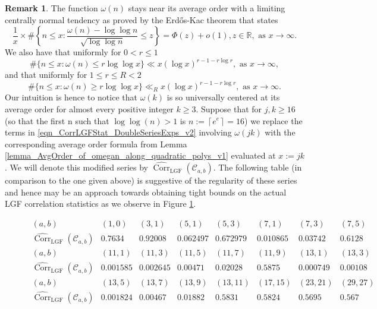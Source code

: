 \documentclass[12pt,reqno,a4letter]{article}
\numberwithin{figure}{section}
\numberwithin{table}{section}
\numberwithin{equation}{section}
\newcommand{\cf}{\textit{cf.~}}
\theoremstyle{plain}
\numberwithin{theorem}{section}
\theoremstyle{definition}
\newtheorem{remark}[theorem]{Remark}
\begin{document}
\begin{remark}
The function $\omega(n)$ stays near its 
average order with a limiting centrally normal tendency as 
proved by the Erd\H{o}s-Kac theorem that states 
\cite[\S 1.7]{IWANIEC-KOWALSKI} \cite[\cf \S 7.4]{MV}
\[
\frac{1}{x} \times \#\left\{n \leq x: \frac{\omega(n) - \log\log n}{\sqrt{\log\log n}} \leq z\right\} = 
     \Phi(z) + o(1), z \in \mathbb{R}, \text{ as } x \rightarrow \infty. 
\]
We also have that uniformly for $0 < r \leq 1$ 
\[
\#\{n \leq x: \omega(n) \leq r \log\log x\} \ll x (\log x)^{r-1-r\log r}, 
     \text{ as } x \rightarrow \infty, 
\]
and that uniformly for $1 \leq r \leq R < 2$ 
\[
\#\{n \leq x: \omega(n) \geq r \log\log x\} \ll_R x (\log x)^{r-1-r\log r}, 
     \text{ as } x \rightarrow \infty. 
\]
Our intuition is hence to notice that $\omega(k)$ is so universally centered at its average order 
for almost every positive integer $k \geq 3$. 
Suppose that for $j, k \geq 16$ 
(so that the first n such that $\log\log(n) > 1$ is $n := \left\lceil e^e \right\rceil = 16$) 
we replace the terms in 
\eqref{eqn_CorrLGFStat_DoubleSeriesExps_v2} 
involving $\omega(jk)$ with the corresponding average order formula from 
Lemma \ref{lemma_AvgOrder_of_omegan_along_quadratic_polys_v1} evaluated at $x := jk$. 
We will denote this modified series by 
$\widehat{\operatorname{Corr}}_{\operatorname{LGF}}(\mathcal{C}_{a,b})$. 
The following table (in comparison to the one given above) is suggestive of the regularity 
of these series and hence may be an approach towards obtaining tight bounds on the 
actual LGF correlation statistics as we observe in 
Figure \ref{figure_CorrLGFHatCab_v2}. 
\end{remark}

\begin{figure}[h!]
\small
\begin{equation*}
\boxed{
\begin{array}{l|l|l|l|l|l|l|l}
(a, b) & (1, 0) & (3, 1) & (5, 1) & (5, 3) & (7, 1) & (7, 3) & (7, 5) \\ \hline
\widehat{\operatorname{Corr}}_{\operatorname{LGF}}(\mathcal{C}_{a,b}) & 
     0.7634 & 0.92008 & 0.062497 & 0.672979 & 0.010865 & 0.03742 & 0.6128 \\ \hline\hline
(a, b) & (11, 1) & (11, 3) & (11, 5) & (11, 7) & (11, 9) & (13, 1) & (13, 3) \\ \hline
\widehat{\operatorname{Corr}}_{\operatorname{LGF}}(\mathcal{C}_{a,b}) & 
     0.001585 & 0.002645 & 0.00471 & 0.02028 & 0.5875 & 0.000749 & 0.00108 \\ \hline\hline 
(a, b) & (13, 5) & (13, 7) & (13, 9) & (13, 11) & (17, 15) & (23, 21) & (29, 27) \\ \hline
\widehat{\operatorname{Corr}}_{\operatorname{LGF}}(\mathcal{C}_{a,b}) & 
     0.001824 & 0.00467 & 0.01882 & 0.5831 & 0.5824 & 0.5695 & 0.567 \\ 
\end{array}
}
\end{equation*}

\caption[Numerical computations of correlation statistics for LGFs (approximation)]{}
\label{figure_CorrLGFHatCab_v2}

\end{figure}
\end{document}
